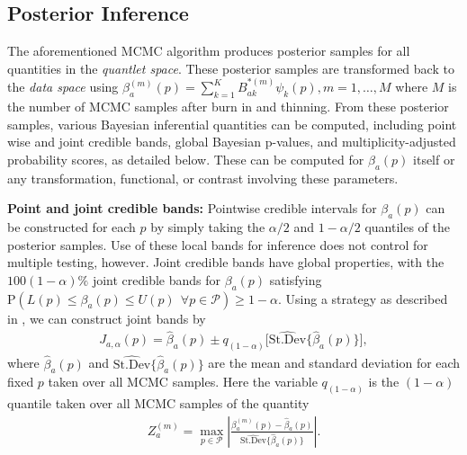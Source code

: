\documentclass[11pt]{article}
\begin{document}
  \subsection{ \bf{Posterior Inference}} \label{sec:BayesInference}

The aforementioned MCMC algorithm produces posterior samples for all quantities in  
the {\it quantlet space}. 
These posterior samples are transformed back to the {\it data space} using %
${\beta}_a^{(m)}(p) = \sum_{k=1}^{K} B_{ak}^{ \ast (m)}\psi_k(p), m=1,\ldots,M$ where $M$ is the number of MCMC samples after burn in and thinning.
From these posterior samples, various Bayesian inferential quantities can be computed, including point wise and joint credible bands, global Bayesian p-values, and multiplicity-adjusted probability scores, as detailed below.  These can be computed for $\beta_a(p)$ itself or any transformation, functional, or contrast involving these parameters.

\textbf{Point and joint credible bands:}  
Pointwise credible intervals for $\beta_a(p)$ can be constructed for each $p$ by simply taking the $\alpha/2$ and $1-\alpha/2$ quantiles of the posterior samples.  Use of these local bands for inference does not control for multiple testing, however.  Joint credible bands have global properties, with  the $100(1-\alpha)\%$ joint credible bands for $\beta_a(p)$ satisfying $  \text{P}(L(p) \le   \beta_a(p) \le U(p) ~~ \forall p \in \mathcal{P} ) \ge 1-\alpha$.  Using a strategy as described in  \cite{ruppert2003semiparametric},  we can construct joint bands by
   \begin{align} \label{p5_jointci}
J_{a,\alpha}(p)= \hat{\beta}_a(p) \pm q_{(1-\alpha)}  \bigl [ \widehat{\text{St.Dev}}\{\hat \beta_a(p)\} 
\bigr ],
\end{align} 
where $\hat \beta_a(p)$ and $\widehat{\text{St.Dev}}\{\hat \beta_a(p)\}$ are the mean and standard deviation
for each fixed $p$ taken over all MCMC samples. 
Here the variable $q_{(1-\alpha)}$ is the $(1-\alpha)$
quantile taken over all MCMC samples of the quantity
   \begin{align*}
Z_a^{(m)}= \max_{p \in \mathcal{P}}\left| \frac{\beta_a^{(m)}(p)-\hat \beta_a(p)}{\widehat{\text{St.Dev}}\{\hat  \beta_a(p)\} }  \right|.
\end{align*} 
\end{document}
